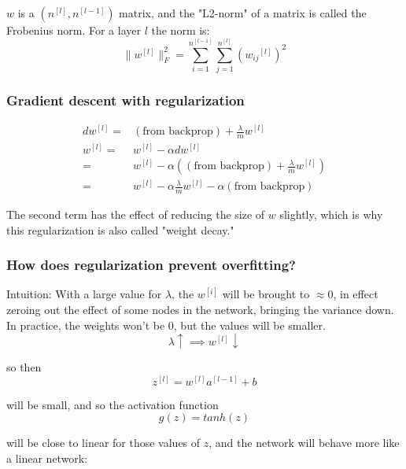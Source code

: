 $w$ is a $(n^{[l]} , n^{[l-1]})$ matrix, and the "L2-norm" of a matrix is called the Frobenius norm. 
For a layer $l$ the norm is:
\[ \|w^{[l]}\|_F^2= \sum_{i=1}^{n^{[l-1]}} \sum_{j=1}^{n^{[l]}}({w_{ij}}^{[l]})^2 \]

\subsubsection*{Gradient descent with regularization}

\begin{align}
    dw^{[l]}= & (\text{from backprop})+ \frac{\lambda}{m} w^{[l]} \\
    w^{[l]} = & w^{[l]} - \alpha dw^{[l]} \\
            = & w^{[l]} - \alpha( (\text{from backprop}) + \frac{\lambda}{m}w^{[l]} ) \\
            = & w^{[l]} - \alpha \frac{\lambda}{m} w^{[l]} - \alpha(\text{from backprop})
\end{align}


The second term has the effect of reducing the size of $w$ slightly, 
which is why this regularization is also called "weight decay."

\subsubsection*{How does regularization prevent overfitting?}

Intuition: With a large value for $\lambda$, the $w^{[i]}$  will be brought to $\approx${0}, 
in effect zeroing out the effect of some nodes in the network, bringing the variance down. 
In practice, the weights won't be 0, but the values will be smaller.
\[ \lambda \uparrow \implies w^{[l]} \downarrow\]

so then
\[ z^{[l]} = w^{[l]}  a^{[l-1]} + b \]

will be small, and so the activation function
\[ g(z)=tanh(z) \]

will be close to linear for those values of $z$, and the network will behave more like a linear network: 






